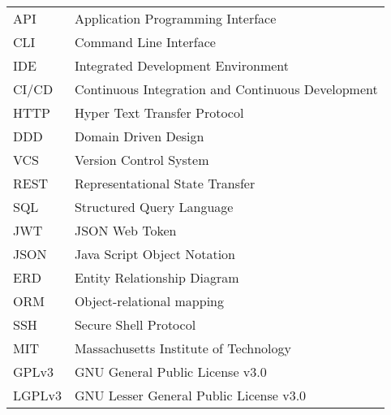 \begin{longtable}{p{3cm}p{10cm}}
    API&Application Programming Interface\\
    CLI&Command Line Interface\\
    IDE&Integrated Development Environment\\
    CI/CD&Continuous Integration and Continuous Development\\
    HTTP&Hyper Text Transfer Protocol\\
    DDD&Domain Driven Design\\
    VCS&Version Control System\\
    REST&Representational State Transfer\\
    SQL&Structured Query Language\\
    JWT&JSON Web Token\\
    JSON&Java Script Object Notation\\
    ERD&Entity Relationship Diagram\\
    ORM&Object-relational mapping\\
    SSH&Secure Shell Protocol\\
    MIT&Massachusetts Institute of Technology\\
    GPLv3&GNU General Public License v3.0\\
    LGPLv3&GNU Lesser General Public License v3.0\\
\end{longtable}
\addtocounter{table}{-1}
